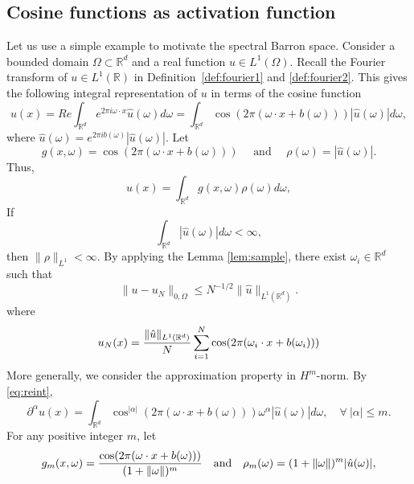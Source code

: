 
\subsection{Cosine functions as activation function}
Let us use a simple example to motivate the spectral Barron space. Consider a bounded domain $\Omega\subset \mathbb
R^d$ and a real function $u\in L^1(\Omega)$.
Recall the Fourier transform of $u\in L^1(\mathbb{R})$ in Definition~\ref{def:fourier1} and \ref{def:fourier2}. 
This gives the following integral representation of $u$ in terms of the cosine function
\begin{equation}
 \label{eq:reint}
u(x)=Re\int_{\mathbb{R}^d} e^{2\pi i\omega\cdot x} \hat u(\omega)d\omega
= \int_{\mathbb{R}^d}\cos (2\pi (\omega\cdot x + b(\omega))) |\hat u(\omega)|d\omega,
\end{equation}
where $ \hat u(\omega)= e^{2\pi ib(\omega)}|\hat u(\omega)|$. Let 
\begin{equation}
 \label{eq:2}
g(x, \omega) = \cos(2\pi (\omega\cdot x + b(\omega)))\quad \mbox{ and }\quad 
\rho(\omega)= |\hat u(\omega)| . 
\end{equation}
Thus, 
\begin{equation}
\label{int-rep}
u(x)= \int_{\mathbb{R}^d}g(x,\omega) \rho(\omega)d\omega,   
\end{equation}
If
$$
\int_{\mathbb R^d} |\hat u(\omega)|d\omega <\infty,
$$
then $\|\rho\|_{L^1}<\infty$. By applying the Lemma \ref{lem:sample},
there exist $\omega_i\in \mathbb R^d$
such that
\begin{equation}
  \label{eq:3}
\|u-u_N\|_{0,\Omega}\le N^{-1/2}\|\hat u\|_{L^1(\mathbb R^d)}.  
\end{equation}
where
\begin{equation}\label{cosfn}
u_N(x) = {\|\hat u\|_{L^1(\mathbb R^d)}\over N} \sum_{i=1}^N \cos (2\pi(\omega_i\cdot x + b(\omega_i)))
\end{equation}
More generally, we consider the approximation property in $H^m$-norm.
By \eqref{eq:reint},
\begin{equation} 
\partial^\alpha u(x)= \int_{\mathbb{R}^d} \cos^{|\alpha|}(2\pi (\omega\cdot x + b(\omega)))\omega^\alpha |\hat u(\omega)|d\omega,  \quad \forall\ |\alpha|\le m.
\end{equation}
For any positive integer $m$, let 
\begin{equation} \label{eq:gm}
g_m(x,\omega)= {\cos (2\pi (\omega\cdot x + b(\omega)))\over  (1+ \|\omega\|)^m}\quad \mbox{and}\quad \rho_m(\omega)= (1+ \|\omega\|)^m|\hat u(\omega) |,
\end{equation}
